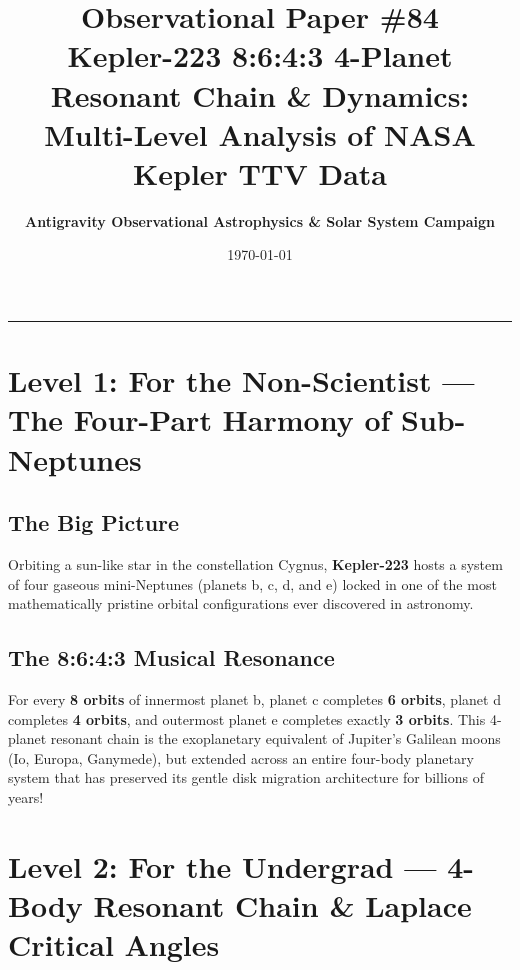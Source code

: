 \documentclass[11pt,a4paper]{article}
\title{\Huge \textbf{Observational Paper \#84}\\ \Large Kepler-223 8:6:4:3 4-Planet Resonant Chain \& Dynamics: Multi-Level Analysis of NASA Kepler TTV Data}
\author{\textbf{Antigravity Observational Astrophysics \& Solar System Campaign}}
\date{\today}
\begin{document}
\maketitle

\vspace{-1em}
\begin{center}
\rule{\textwidth}{1.5pt}
\end{center}

\section*{Level 1: For the Non-Scientist — The Four-Part Harmony of Sub-Neptunes}

\subsection*{The Big Picture}
Orbiting a sun-like star in the constellation Cygnus, \textbf{Kepler-223} hosts a system of four gaseous mini-Neptunes (planets b, c, d, and e) locked in one of the most mathematically pristine orbital configurations ever discovered in astronomy.

\subsection*{The 8:6:4:3 Musical Resonance}
For every \textbf{8 orbits} of innermost planet b, planet c completes \textbf{6 orbits}, planet d completes \textbf{4 orbits}, and outermost planet e completes exactly \textbf{3 orbits}. This 4-planet resonant chain is the exoplanetary equivalent of Jupiter's Galilean moons (Io, Europa, Ganymede), but extended across an entire four-body planetary system that has preserved its gentle disk migration architecture for billions of years!

\newpage

\section*{Level 2: For the Undergrad — 4-Body Resonant Chain \& Laplace Critical Angles}
\end{document}

